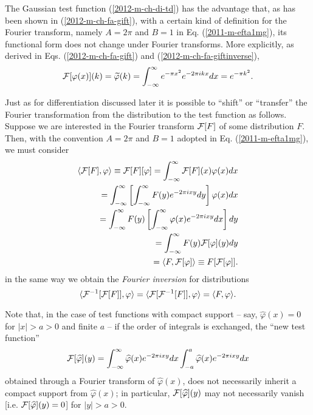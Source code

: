 The  Gaussian  test function (\ref{2012-m-ch-di-td})
has the advantage that, as has been shown in
(\ref{2012-m-ch-fa-gift}),
with a certain kind of definition for the Fourier transform,
namely  $A=2\pi $ and $B=1$  in Eq. (\ref{2011-m-efta1mg}),
its functional form does not change under Fourier transforms.
More explicitly, as derived in Eqs.
(\ref{2012-m-ch-fa-gift})
and
(\ref{2012-m-ch-fa-giftinverse}),
\begin{equation}
    {\cal F}[\varphi (x)](k)=\widetilde{\varphi} (k) =  \int_{-\infty}^\infty
                e^{-\pi  x^2}  e^{- 2\pi ikx} dx
 = e^{-{\pi k^2}} .
\end{equation}

Just as for differentiation discussed later it is possible to ``shift'' or ``transfer'' the
Fourier transformation from the distribution to the test function
as follows.
Suppose we are interested in the Fourier transform ${\cal F}[F]$ of some distribution $F$.
Then, with the convention
 $A=2\pi $ and $B=1$  adopted in Eq. (\ref{2011-m-efta1mg}), we must consider
\begin{equation}
\begin{split}
\langle  {\cal F}[F ], \varphi \rangle \equiv {\cal F}[F ][\varphi ]
=
\int_{-\infty}^\infty {\cal F}[F](x) \varphi (x) dx
\\ \qquad =
\int_{-\infty}^\infty \left[ \int_{-\infty}^\infty F(y) e^{- 2\pi ixy} dy \right] \varphi (x) dx
\\ \qquad =
\int_{-\infty}^\infty  F(y)  \left[ \int_{-\infty}^\infty \varphi (x) e^{- 2\pi ixy}  dx \right] dy
\\ \qquad =
\int_{-\infty}^\infty  F(y)  {\cal F}[ \varphi ](y) dy
\\ \qquad =
\langle  F , {\cal F}[\varphi ]\rangle \equiv F [{\cal F}[\varphi ]]
.
\end{split}
\end{equation}
in the same way we obtain the
{\em Fourier inversion}
for distributions
\begin{equation}
\langle   {\cal F}^{-1}[{\cal F}[F ]], \varphi \rangle
=
\langle   {\cal F}[{\cal F}^{-1}[F ]], \varphi \rangle
=
\langle    F  , \varphi \rangle
.
\end{equation}

Note that, in the case of test functions with compact support -- say, $\widehat{\varphi} (x) = 0$ for $\vert x \vert > a > 0$ and finite $a$
--  if the order of integrals is exchanged, the ``new test function''
\begin{equation}
{\cal F}[ \widehat{\varphi}] (y)=
\int_{-\infty}^\infty  \widehat{\varphi} (x) e^{- 2\pi ixy}  dx
\int_{-a}^a  \widehat{\varphi} (x) e^{- 2\pi ixy}  dx
\end{equation}
obtained through a Fourier transform of  $\widehat{\varphi} (x)$,
does not necessarily inherit a compact support  from $\widehat{\varphi} (x)$;
in particular,
${\cal F}[ \widehat{\varphi}] (y)$
may not necessarily vanish [i.e.  ${\cal F}[ \widehat{\varphi}] (y) = 0$] for $\vert y \vert > a > 0$.


